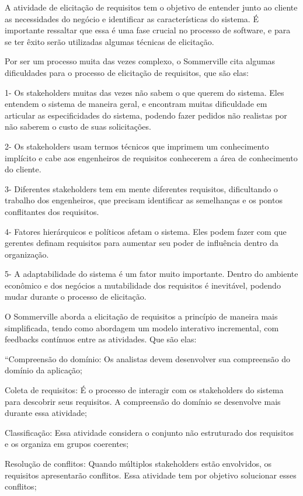 A atividade de elicitação de requisitos tem o objetivo de entender junto ao cliente as necessidades do negócio e identificar as características do sistema. É importante ressaltar que essa é uma fase crucial no processo de software, e para se ter êxito serão utilizadas algumas técnicas de elicitação.

Por ser um processo muita das vezes complexo, o Sommerville cita algumas dificuldades para o processo de elicitação de requisitos, que são elas:

1- Os stakeholders muitas das vezes não sabem o que querem do sistema. Eles entendem o sistema de maneira geral, e encontram muitas dificuldade em articular as especificidades do sistema, podendo fazer pedidos não realistas por não saberem o custo de suas solicitações.

2- Os stakeholders usam termos técnicos que imprimem um conhecimento implícito e cabe aos engenheiros de requisitos conhecerem a área de conhecimento do cliente.

3- Diferentes stakeholders tem em mente diferentes requisitos, dificultando o trabalho dos engenheiros, que precisam identificar as semelhanças e os pontos conflitantes dos requisitos.

4- Fatores hierárquicos e políticos afetam o sistema. Eles podem fazer com que gerentes definam requisitos para aumentar seu poder de influência dentro da organização.

5- A adaptabilidade do sistema é um fator muito importante. Dentro do ambiente econômico e dos negócios a mutabilidade dos requisitos é inevitável, podendo mudar durante o processo de elicitação.

O Sommerville aborda a elicitação de requisitos a princípio de maneira mais simplificada, tendo como abordagem um modelo interativo incremental, com feedbacks contínuos entre as atividades. Que são elas:

“Compreensão do domínio: Os analistas devem desenvolver sua compreensão
do domínio da aplicação;

Coleta de requisitos: É o processo de interagir com os stakeholders do sistema
para descobrir seus requisitos. A compreensão do domínio se desenvolve mais durante essa atividade;

Classificação: Essa atividade considera o conjunto não estruturado dos
requisitos e os organiza em grupos coerentes;

Resolução de conflitos: Quando múltiplos stakeholders estão envolvidos, os
requisitos apresentarão conflitos. Essa atividade tem por objetivo solucionar
esses conflitos;

